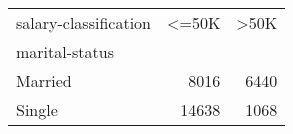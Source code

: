 \begin{tabular}{lrr}
\toprule
salary-classification &   <=50K &   >50K \\
marital-status &         &        \\
\midrule
Married        &    8016 &   6440 \\
Single         &   14638 &   1068 \\
\bottomrule
\end{tabular}
